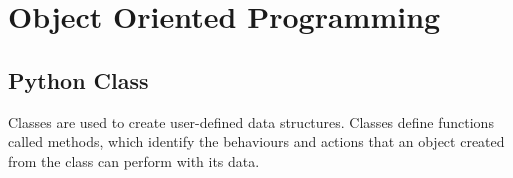 \chapter{Object Oriented Programming}
\section{Python Class}
Classes are used to create user-defined data structures. Classes define functions called methods, which identify the behaviours and actions that an object created from the class can perform with its data.